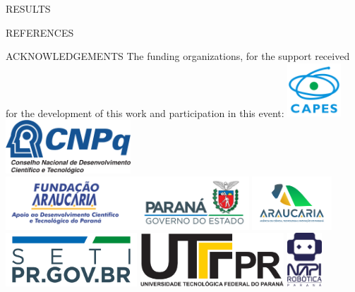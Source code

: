 \documentclass[%
  final,%
  english,%
  english,%
]{beamer}
\begin{document}
\begin{frame}[t, fragile = singleslide]
\begin{columns}[t, onlytextwidth]
\begin{column}{.49\textwidth}
\begin{block}{RESULTS}
\end{block}
%
\begin{block}{REFERENCES}
  \printbibliography[heading = none]
\end{block}
%
\begin{block}{ACKNOWLEDGEMENTS}
\footnotesize%
The funding organizations, for the support received for the development of this work and participation in this event:
\vfill%
\includegraphics[height = 20mm]{./Logos/apoio-capes}
\hspace*{5mm}
\includegraphics[height = 20mm]{./Logos/apoio-cnpq}
\hspace*{5mm}
\includegraphics[height = 20mm]{./Logos/apoio-fa-gov-pr}
\hspace*{5mm}
\includegraphics[height = 20mm]{./Logos/fa}
\hspace*{5mm}
\includegraphics[height = 20mm]{./Logos/seti}
\hspace*{5mm}
\includegraphics[height = 20mm]{./Logos/utfpr}
\hspace*{5mm}
\includegraphics[height = 20mm]{./Logos/napi_robotica.png}

\end{block}
\end{column}
\end{columns}
\end{frame}
\end{document}

